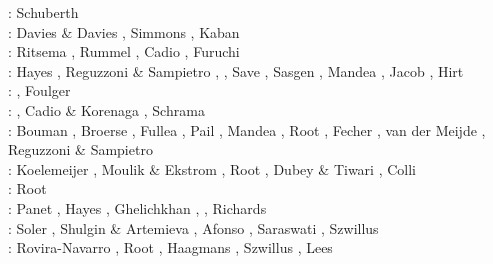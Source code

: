\begin{scriptsize}
\twothousandnine: Schuberth \etal \cite{scbr09}\\
\twothousandten: Davies \& Davies \cite{dada10}, Simmons \etal \cite{sifb10}, 
                 Kaban \etal \cite{katc10}\\
\twothousandeleven: Ritsema \etal \cite{ridv11}, Rummel \etal \cite{ruys11}, 
                    Cadio \etal \cite{capd11}, Furuchi \cite{furu11}\\
\twothousandtwelve: Hayes \etal \cite{hawj12}, Reguzzoni \& Sampietro \cite{resa12},
                    \cite{fesw12}\cite{simj12}\cite{beck12}\cite{pahk12}, 
                    Save \etal \cite{sabt12}, Sasgen \etal \cite{sakm12}, 
                    Mandea \etal \cite{mapl12}, Jacob \etal \cite{jawp12},
                    Hirt \etal \cite{hick12}\\
\twothousandthirteen: \cite{ress13}\cite{ebbf13}\cite{davi13}\cite{scle13}\cite{waja13}, 
                      Foulger \etal \cite{fopa13}\\
\twothousandfourteen: \cite{paml14}\cite{ebbf14}\cite{krbk14}\cite{licl14}\cite{aubb14}, 
                      Cadio \& Korenaga \cite{cako14}, Schrama \etal \cite{scwr14}\\
\twothousandfifteen: Bouman \etal \cite{boem15}, Broerse \etal \cite{brrs15}, 
                     Fullea \etal \cite{furc15}, Pail \etal \cite{pabb15},
                     Mandea \etal \cite{manp15}, Root \etal \cite{rotv15},
                     Fecher \etal \cite{fepg15}, van der Meijde \etal \cite{vapb15},
                     Reguzzoni \& Sampietro \cite{resa15}\\
\twothousandsixteen: Koelemeijer \etal \cite{kord16}, Moulik \& Ekstrom \cite{moek16}, 
                     Root \etal \cite{rond16}, 
                     Dubey \& Tiwari \cite{duti16}, Colli \etal \cite{cogb16}\\
\twothousandseventeen: Root \etal \cite{roev17}\\
\twothousandeighteen: Panet \etal \cite{pabn18}, Hayes \etal \cite{hamp18}, 
                      Ghelichkhan \etal \cite{ghmc18}, \cite{homs18}, 
                      Richards \etal \cite{rihc18}\\
\twothousandnineteen: Soler \etal \cite{sopg19}, Shulgin \& Artemieva \cite{shar19}, 
                      Afonso \etal \cite{afss19}, 
                      Saraswati \cite{sacm19}, Szwillus \etal \cite{szae19}\\
\twothousandtwenty: Rovira-Navarro \etal \cite{rovb20}, Root \cite{root20}, 
                    Haagmans \etal \cite{hasm20}, Szwillus \etal \cite{szes20},
                    Lees \etal \cite{lerm20}
\end{scriptsize}

